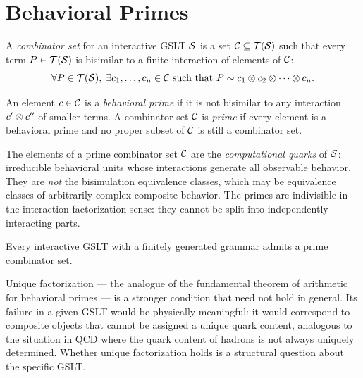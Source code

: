 \section{Behavioral Primes}

\begin{definition}
A \emph{combinator set} for an interactive GSLT $\mathcal{S}$ is a set
$\mathcal{C} \subseteq \mathcal{T}(\mathcal{S})$ such that every term
$P \in \mathcal{T}(\mathcal{S})$ is bisimilar to a finite interaction of
elements of $\mathcal{C}$:
\[
  \forall P \in \mathcal{T}(\mathcal{S}),\;
  \exists c_1, \ldots, c_n \in \mathcal{C} \text{ such that }
  P \sim c_1 \otimes c_2 \otimes \cdots \otimes c_n.
\]
\end{definition}

\begin{definition}
An element $c \in \mathcal{C}$ is a \emph{behavioral prime} if it is not
bisimilar to any interaction $c' \otimes c''$ of smaller terms.
A combinator set $\mathcal{C}$ is \emph{prime} if every element is a
behavioral prime and no proper subset of $\mathcal{C}$ is still a
combinator set.
\end{definition}

\begin{remark}
The elements of a prime combinator set $\mathcal{C}$ are the
\emph{computational quarks} of $\mathcal{S}$: irreducible behavioral units
whose interactions generate all observable behavior.
They are \emph{not} the bisimulation equivalence classes, which may
be equivalence classes of arbitrarily complex composite behavior.
The primes are indivisible in the interaction-factorization sense:
they cannot be split into independently interacting parts.
\end{remark}

\begin{conjecture}
Every interactive GSLT with a finitely generated grammar admits a
prime combinator set.
\end{conjecture}

\begin{remark}
Unique factorization --- the analogue of the fundamental theorem of
arithmetic for behavioral primes --- is a stronger condition that
need not hold in general.
Its failure in a given GSLT would be physically meaningful:
it would correspond to composite objects that cannot be assigned a
unique quark content, analogous to the situation in QCD where
the quark content of hadrons is not always uniquely determined.
Whether unique factorization holds is a structural question about
the specific GSLT.
\end{remark}

